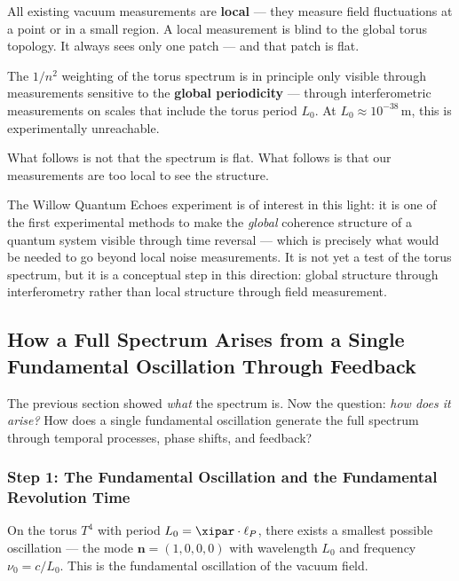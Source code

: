 \begin{conclusionBox}
All existing vacuum measurements are \textbf{local} — they measure field
fluctuations at a point or in a small region. A local measurement is blind to
the global torus topology. It always sees only one patch — and that patch is flat.

The $1/n^2$ weighting of the torus spectrum is in principle only visible through
measurements sensitive to the \textbf{global periodicity} — through interferometric
measurements on scales that include the torus period $L_0$. At
$L_0 \approx 10^{-38}$\,m, this is experimentally unreachable.

What follows is not that the spectrum is flat. What follows is that our
measurements are too local to see the structure.
\end{conclusionBox}

The Willow Quantum Echoes experiment is of interest in this light: it is one of
the first experimental methods to make the \emph{global} coherence structure of a
quantum system visible through time reversal — which is precisely what would be
needed to go beyond local noise measurements. It is not yet a test of the torus
spectrum, but it is a conceptual step in this direction: global structure
through interferometry rather than local structure through field measurement.

\subsection{How a Full Spectrum Arises from a Single Fundamental Oscillation
Through Feedback}

The previous section showed \emph{what} the spectrum is. Now the question:
\emph{how does it arise?} How does a single fundamental oscillation generate the
full spectrum through temporal processes, phase shifts, and feedback?

\subsubsection*{Step 1: The Fundamental Oscillation and the Fundamental Revolution Time}

On the torus $T^4$ with period $L_0 = \xipar \cdot \ell_P$, there exists a
smallest possible oscillation — the mode $\mathbf{n} = (1,0,0,0)$ with
wavelength $L_0$ and frequency $\nu_0 = c/L_0$. This is the fundamental
oscillation of the vacuum field.

